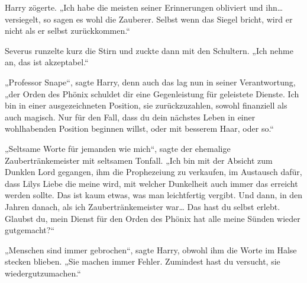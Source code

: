 Harry zögerte.
„Ich habe die meisten seiner Erinnerungen obliviert und ihn…versiegelt, so sagen es wohl die Zauberer. Selbst wenn das Siegel bricht, wird er nicht als er selbst zurückkommen.“

Severus runzelte kurz die Stirn und zuckte dann mit den Schultern.
„Ich nehme an, das ist akzeptabel.“

„Professor Snape“, sagte Harry, denn auch das lag nun in seiner Verantwortung, „der Orden des Phönix schuldet dir eine Gegenleistung für geleistete Dienste.
Ich bin in einer ausgezeichneten Position, sie zurückzuzahlen, sowohl finanziell als auch magisch. Nur für den Fall, dass du dein nächstes Leben in einer wohlhabenden Position beginnen willst, oder mit besserem Haar, oder so.“

„Seltsame Worte für jemanden wie mich“, sagte der ehemalige Zaubertränkemeister mit seltsamen Tonfall. „Ich bin mit der Absicht zum Dunklen Lord gegangen, ihm die Prophezeiung zu verkaufen, im Austausch dafür, dass Lilys Liebe die meine wird, mit welcher Dunkelheit auch immer das erreicht werden sollte. Das ist kaum etwas, was man leichtfertig vergibt. Und dann, in den Jahren danach, als ich Zaubertränkemeister war… Das hast du selbst erlebt. Glaubst du, mein Dienst für den Orden des Phönix hat alle meine Sünden wieder gutgemacht?“

„Menschen sind immer gebrochen“, sagte Harry, obwohl ihm die Worte im Halse stecken blieben. „Sie machen immer Fehler. Zumindest hast du versucht, sie wiedergutzumachen.“

